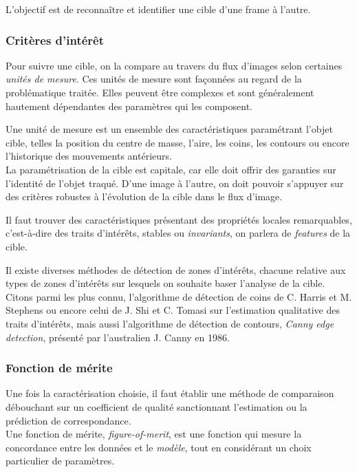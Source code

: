 \documentclass[a4paper,11pt]{report}
\begin{document}
L'objectif est de reconnaître et identifier une cible d'une frame à l'autre. 

\subsubsection{Critères d'intérêt}
Pour suivre une cible, on la compare au travers du flux d'images selon certaines \textit{unités de mesure}.
Ces unités de mesure sont façonnées au regard de la problématique traitée. Elles peuvent \^etre complexes et sont généralement hautement dépendantes des paramètres qui les composent.

Une unité de mesure est un ensemble des caractéristiques paramétrant l'objet cible, telles la position du centre de masse, l'aire, les coins, les contours ou encore l'historique des mouvements antérieurs. \\

La paramétrisation de la cible est capitale, car elle doit offrir des garanties sur l'identité de l'objet traqué. 
D'une image à l'autre, on doit pouvoir s'appuyer sur des critères robustes à l'évolution de la cible dans le flux d'image.


Il faut trouver des caractéristiques présentant des propriétés locales remarquables, c'est-à-dire des traits d'intérêts, stables ou \textit{invariants}, on parlera de \textit{features} de la cible.

Il existe diverses méthodes de détection de zones d'intérêts, chacune relative aux types de zones d'intérêts sur lesquels on souhaite baser l'analyse de la cible. Citons parmi les plus connu, l'algorithme de détection de coins de C. Harris et M. Stephens ou encore celui de J. Shi et C. Tomasi sur l'estimation qualitative des traits d'intérêts, mais aussi l'algorithme de détection de contours, \textit{Canny edge detection}, présenté par l'australien J. Canny en 1986.

\subsubsection{Fonction de mérite}
Une fois la caractérisation choisie, il faut établir une méthode de comparaison débouchant sur un coefficient de qualité sanctionnant l'estimation ou la prédiction de correspondance.\\

Une fonction de mérite, \textit{figure-of-merit}, est une fonction qui mesure la concordance entre les données et le \textit{modèle}, tout en considérant un choix particulier de paramètres.\\
\end{document}
